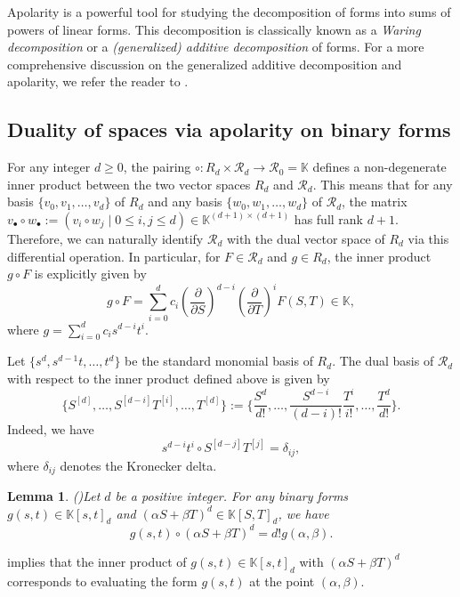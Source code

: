 \documentclass[a4paper, 11pt]{amsart}
\numberwithin{theorem}{section}
\newtheorem{lemma}[theorem]{Lemma}
\theoremstyle{definition}
\numberwithin{equation}{section}
\begin{document}
Apolarity is a powerful tool for studying the decomposition of forms into sums of powers of linear forms. 
This decomposition is classically known as a \emph{Waring decomposition} or a \emph{(generalized) additive decomposition} of forms. 
For a more comprehensive discussion on the generalized additive decomposition and apolarity, we refer the reader to \cite{MR1735271}.

\subsection{Duality of spaces via apolarity on binary forms}\label{subsec:spaceDuality}
For any integer $d \geq 0$, the pairing $\circ : R_d \times \mathcal{R}_d \to \mathcal{R}_0 = \mathbb{K}$ defines a non-degenerate inner product between the two vector spaces $R_d$ and $\mathcal{R}_d$. 
This means that for any basis $\{v_0, v_1, \dots, v_d\}$ of $R_d$ and any basis $\{w_0, w_1, \dots, w_d\}$ of $\mathcal{R}_d$, the matrix $v_{\bullet} \circ w_{\bullet} := (v_i \circ w_j \mid 0 \leq i,j \leq d) \in \mathbb{K}^{(d+1)\times(d+1)}$ has full rank $d+1$. 
Therefore, we can naturally identify $\mathcal{R}_d$ with the dual vector space of $R_d$ via this differential operation. 
In particular, for $F \in \mathcal{R}_d$ and $g \in R_d$, the inner product $g \circ F$ is explicitly given by
\[
g \circ F = \sum_{i = 0}^{d} c_i \left(\frac{\partial}{\partial S}\right)^{d-i} \left(\frac{\partial}{\partial T}\right)^{i} F(S,T) \in \mathbb{K},
\]
where $g = \sum_{i = 0}^{d} c_i s^{d-i} t^{i}$.

Let $\{s^d, s^{d-1}t, \dots, t^d\}$ be the standard monomial basis of $R_d$. 
The dual basis of $\mathcal{R}_d$ with respect to the inner product defined above is given by 
\[
\{S^{[d]}, \dots, S^{[d-i]}T^{[i]}, \dots, T^{[d]}\} := \{\frac{S^d}{d!}, \dots, \frac{S^{d-i}}{(d-i)!}\frac{T^i}{i!}, \dots, \frac{T^d}{d!}\}. 
\]
Indeed, we have
\begin{equation*}\label{eqn:duality}
s^{d-i}t^i\circ S^{[d-j]}T^{[j]}=\delta_{ij},
\end{equation*}
where $\delta_{ij}$ denotes the Kronecker delta.

\begin{lemma}(\cite[Lemma 2.3]{MR5047032})\label{lem:evaluation}
Let $d$ be a positive integer.
For any binary forms $g(s,t)\in \mathbb{K}[s,t]_d$ and $(\alpha S+\beta T)^d\in \mathbb{K}[S,T]_d$, we have
\[
g(s,t)\circ (\alpha S+\beta T)^d = d!g(\alpha,\beta).
\]
\end{lemma}
 implies that the inner product of $g(s,t) \in \mathbb{K}[s,t]_d$ with $(\alpha S + \beta T)^d$ corresponds to evaluating the form $g(s,t)$ at the point $(\alpha, \beta)$.
\end{document}
